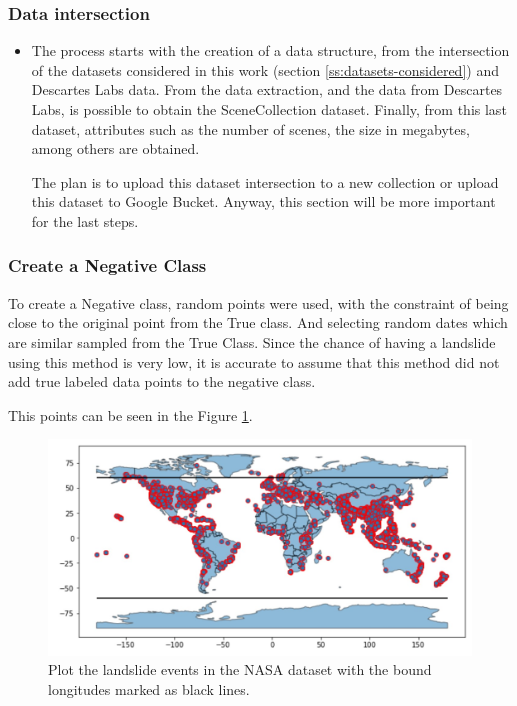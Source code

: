 \documentclass[sigconf, nonacm]{acmart}
\begin{document}
\subsubsection{Data intersection}
\begin{itemize}
    \item The process starts with the creation of a data structure, from the intersection of the datasets considered in this work (section \ref{ss:datasets-considered}) and Descartes Labs data. From the data extraction, and the data from Descartes Labs, is possible to obtain the SceneCollection dataset. Finally, from this last dataset, attributes such as the number of scenes, the size in megabytes, among others are obtained.

    The plan is to upload this dataset intersection to a new collection or upload this dataset to Google Bucket. Anyway, this section will be more important for the last steps.
\end{itemize}

\subsubsection{Create a Negative Class}\noindent

To create a Negative class, random points were used, with the constraint of being close to the original point from the True class. And selecting random dates which are similar sampled from the True Class. Since the chance of having a landslide using this method is very low, it is accurate  to assume that this method did not add true labeled data points to the negative class.

This points can be seen in the Figure \ref{fig:no-landslide}.

\begin{figure}
  \centering
  \includegraphics[width=\linewidth]{figures/mapa_no_landslide.jpg}
  \caption{Plot the landslide events in the NASA dataset with the bound longitudes marked as black lines.}
  \label{fig:no-landslide}
\end{figure}
\end{document}
